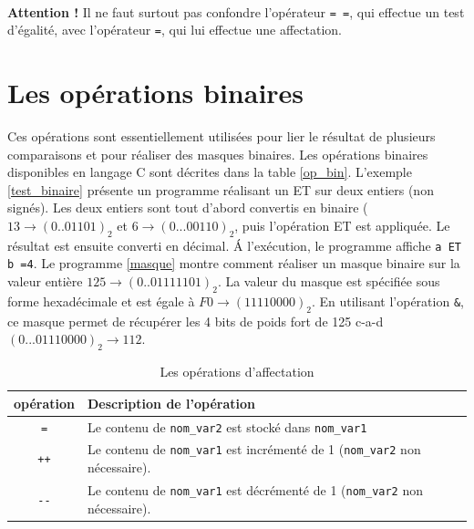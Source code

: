 \documentclass[a4paper,11pt]{book}
\newenvironment{warning} 
   {~\\ \textbf{Attention !}}{\\}
\theoremstyle{definition}
\begin{document}
\begin{warning}
Il ne faut surtout pas confondre l'opérateur \texttt{=~=}, qui effectue un test d'égalité, avec l'opérateur \texttt{=}, qui lui effectue une affectation.
\end{warning}
\section{Les opérations binaires}
\label{sec_bin} Ces opérations sont essentiellement utilisées
pour lier le résultat de plusieurs comparaisons et pour réaliser
des masques binaires. Les opérations binaires disponibles en langage C sont
décrites dans la table \ref{op_bin}. L'exemple \ref{test_binaire}
présente un programme réalisant un ET sur deux entiers (non signés). Les deux entiers sont tout d'abord convertis en binaire ($13\to (0..01101)_{2}$ et $6\to (0...00110)_{2}$, puis l'opération ET est  appliquée. Le résultat est ensuite converti en décimal. \'A l'exécution, le programme
affiche \texttt{a ET b =4}. Le programme \ref{masque} montre comment réaliser un masque binaire sur la valeur entière $125 \to (0..0111 1101)_{2}$. La valeur du masque est spécifiée sous forme hexadécimale et est égale à $F0\to (1111 0000)_{2}$. En utilisant l'opération \texttt{\&}, ce masque permet de récupérer les 4 bits de poids fort de 125 c-a-d $(0...0111 0000)_{2}\to 112$.





\clearpage

\begin{table}[!t]
\centering
\begin{tabular}{cp{10cm}}
  \hline
  \textbf{opération} & Description de l'opération\\
  \hline
  \texttt{=} & Le contenu de \texttt{nom\_var2} est stocké dans \texttt{nom\_var1} \\
  \texttt{++} & Le contenu de \texttt{nom\_var1} est incrémenté de 1 (\texttt{nom\_var2} non nécessaire).\\
  \texttt{-\phantom{}-} & Le contenu de \texttt{nom\_var1} est décrémenté de 1 (\texttt{nom\_var2} non nécessaire).\\
  \hline
\end{tabular}
\caption{Les opérations d'affectation\label{op_affec}}
\end{table}
\end{document}
